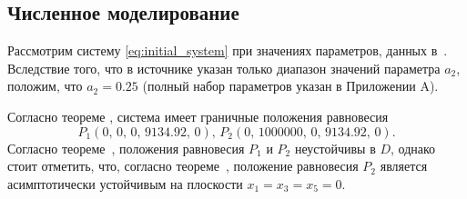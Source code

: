 \documentclass[14pt,a4paper]{extarticle}
\begin{document}
	\subsection{Численное моделирование}
	
	\begin{example}
		Рассмотрим систему \ref{eq:initial_system} при значениях параметров, данных в~\cite{model_params}. Вследствие того, что в источнике указан только диапазон значений параметра $a_2$, положим, что $a_2=0.25$ (полный набор параметров указан в Приложении A). 
		
		Согласно теореме , система имеет граничные положения равновесия
		\[P_1\left(0,\,0,\,0,\,9134.92,\,0\right),\, P_2\left(0,\,1000000,\,0,\,9134.92,\,0\right).\]
		Согласно теореме~, положения равновесия $P_1$ и $P_2$ неустойчивы в $D$, однако стоит отметить, что, согласно теореме~, положение равновесия $P_2$ является асимптотически устойчивым на плоскости $x_1=x_3=x_5=0$. 
		

\end{example}
\end{document}
